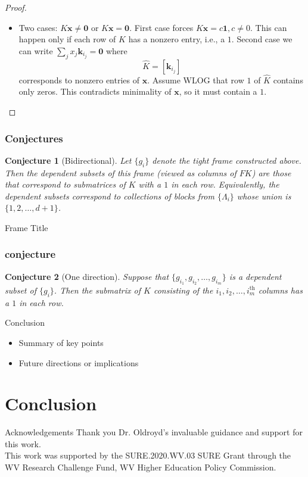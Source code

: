 \documentclass{beamer}
\newtheorem{conjecture}{Conjecture}
\renewcommand{\vec}[1]{\mathbf{#1}}
\begin{document}
{\begin{frame}
\begin{proof}
\begin{itemize}
            \item <3-> Two cases: $K\vec{x}\neq\vec{0}$ or $K\vec{x} = \vec{0}$.
            First case forces $K\vec{x} = c\vec{1}, c\neq 0$.
            This can happen only if each row of $K$ has a nonzero entry, i.e., a $1$.
            Second case we can write $\sum_j x_j \vec{k}_{i_j} = \vec{0}$ where
            \[
                \widehat{K} = [\vec{k}_{i_j}]
            \]
            corresponds to nonzero entries of $\vec{x}$.
            Assume WLOG that row $1$ of $\widehat{K}$ contains only zeros.
            This contradicts minimality of $\vec{x}$, so it must contain a $1$.\qedhere
        \end{itemize}
    \end{proof}
\end{frame}

\begin{frame}
    \frametitle{Conjectures}
	\begin{conjecture}
	[Bidirectional]
    Let $\{g_i\}$ denote the tight frame constructed above.
    Then the dependent subsets of this frame (viewed as columns of $FK$) are those that correspond to submatrices of $K$ with a $1$ in each row.
    Equivalently, the dependent subsets correspond to collections of blocks from $\{\Lambda_i\}$ whose union is $\{1,2,\ldots, d+1\}$.
	\end{conjecture}

\end{frame}
\begin{frame}{Frame Title}
    \frametitle{conjecture}
        \begin{conjecture}
            [One direction]
    Suppose that $\{g_{i_1}, g_{i_2}, \ldots, g_{i_m}\}$ is a dependent subset of $\{g_i\}$.
    Then the submatrix of $K$ consisting of the $i_1, i_2, \ldots, i_m^{\text{th}}$ columns has a $1$ in each row.
        \end{conjecture}
\end{frame}
}   



\begin{frame}{Conclusion}
  \begin{itemize}
    \item Summary of key points
    \item Future directions or implications
  \end{itemize}
\end{frame}

\section{Conclusion}
\begin{frame}{Acknowledgements}
    Thank you Dr. Oldroyd's invaluable guidance and support for this work. \\
    
    This work was supported by the SURE.2020.WV.03 SURE Grant through the WV Research Challenge Fund, WV Higher Education Policy Commission.
\end{frame}
\end{document}
